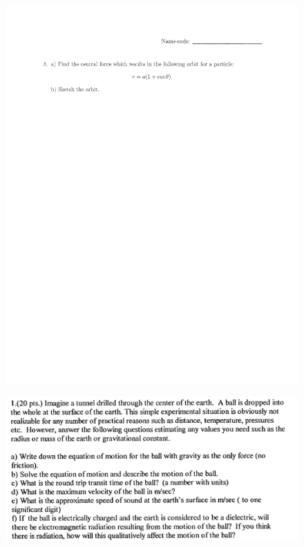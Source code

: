 \documentclass[10pt,a4paper]{article}
\begin{document}
\begin{figure}[H]
 \centering
 \includegraphics[width=16cm]{pdf/1-1T59.png}
\end{figure}
 \newpage
\begin{figure}[H]
 \centering
 \includegraphics[width=16cm]{pdf/1-1T5.png}
\end{figure}
 \newpage
\end{document}
